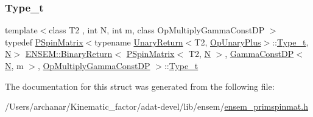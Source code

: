 \subsubsection{\texorpdfstring{Type\_t}{Type\_t}\hspace{0.1cm}{\footnotesize\ttfamily [3/3]}}
{\footnotesize\ttfamily template$<$class T2 , int N, int m, class Op\+Multiply\+Gamma\+Const\+DP $>$ \\
typedef \mbox{\hyperlink{classENSEM_1_1PSpinMatrix}{P\+Spin\+Matrix}}$<$typename \mbox{\hyperlink{structENSEM_1_1UnaryReturn}{Unary\+Return}}$<$T2, \mbox{\hyperlink{structENSEM_1_1OpUnaryPlus}{Op\+Unary\+Plus}}$>$\+::\mbox{\hyperlink{structENSEM_1_1BinaryReturn_3_01PSpinMatrix_3_01T2_00_01N_01_4_00_01GammaConstDP_3_01N_00_01m_01fc91b4deeb7eab4452a6a4224b8c6fde_a5b21fbac81677fb0f3fc8d55111dfd16}{Type\+\_\+t}}, \mbox{\hyperlink{adat__devel_2lib_2hadron_2operator__name__util_8cc_a7722c8ecbb62d99aee7ce68b1752f337}{N}}$>$ \mbox{\hyperlink{structENSEM_1_1BinaryReturn}{E\+N\+S\+E\+M\+::\+Binary\+Return}}$<$ \mbox{\hyperlink{classENSEM_1_1PSpinMatrix}{P\+Spin\+Matrix}}$<$ T2, \mbox{\hyperlink{adat__devel_2lib_2hadron_2operator__name__util_8cc_a7722c8ecbb62d99aee7ce68b1752f337}{N}} $>$, \mbox{\hyperlink{classENSEM_1_1GammaConstDP}{Gamma\+Const\+DP}}$<$ \mbox{\hyperlink{adat__devel_2lib_2hadron_2operator__name__util_8cc_a7722c8ecbb62d99aee7ce68b1752f337}{N}}, m $>$, \mbox{\hyperlink{structENSEM_1_1OpMultiplyGammaConstDP}{Op\+Multiply\+Gamma\+Const\+DP}} $>$\+::\mbox{\hyperlink{structENSEM_1_1BinaryReturn_3_01PSpinMatrix_3_01T2_00_01N_01_4_00_01GammaConstDP_3_01N_00_01m_01fc91b4deeb7eab4452a6a4224b8c6fde_a5b21fbac81677fb0f3fc8d55111dfd16}{Type\+\_\+t}}}



The documentation for this struct was generated from the following file\+:\begin{DoxyCompactItemize}
\item 
/\+Users/archanar/\+Kinematic\+\_\+factor/adat-\/devel/lib/ensem/\mbox{\hyperlink{adat-devel_2lib_2ensem_2ensem__primspinmat_8h}{ensem\+\_\+primspinmat.\+h}}\end{DoxyCompactItemize}
